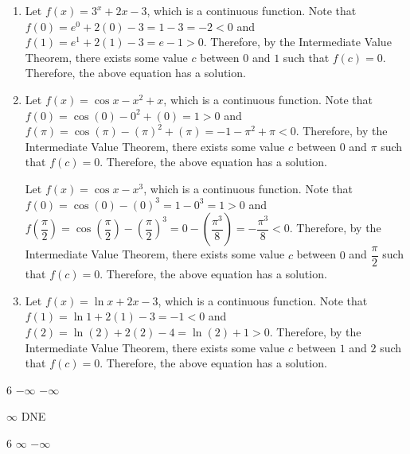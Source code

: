 \documentclass{book}
\begin{document}
\begin{appendices}
\begin{enumerate}[!HW!]
\begin{pf}
\end{pf}
\item
\begin{pf}
Let $f(x) = 3^x+2x-3$, which is a continuous function. Note that $f(0) = e^0 +2(0)-3 = 1-3 = -2 < 0$ and $f(1) = e^1+2(1) - 3 = e-1 > 0$. Therefore, by the Intermediate Value Theorem, there exists some value $c$ between $0$ and $1$ such that $f(c) = 0$. Therefore, the above equation has a solution.
\end{pf}
\item 
\begin{pf}
Let $f(x) = \cos x - x^2+x$, which is a continuous function. Note that $f(0) = \cos(0) - 0^2 +(0) = 1 > 0$ and $f(\pi) = \cos(\pi) - (\pi)^2+(\pi) =-1 -\pi^2+\pi < 0$. Therefore, by the Intermediate Value Theorem, there exists some value $c$ between $0$ and $\pi$ such that $f(c) = 0$. Therefore, the above equation has a solution.
\end{pf}
\itemspade 
\begin{pf}
Let $f(x) = \cos x - x^3$, which is a continuous function. Note that $f(0) = \cos(0) - (0)^3 = 1-0^3 = 1 > 0$ and $f\left(\dfrac{\pi}{2}\right) = \cos\left(\dfrac{\pi}{2}\right) - \left(\dfrac{\pi}{2}\right)^3 = 0 - \left(\dfrac{\pi^3}{8}\right) = -\dfrac{\pi^3}{8} < 0$. Therefore, by the Intermediate Value Theorem, there exists some value $c$ between $0$ and $\dfrac{\pi}{2}$ such that $f(c) = 0$. Therefore, the above equation has a solution.
\end{pf}
\item 
\begin{pf}
Let $f(x) = \ln x +2x -3$, which is a continuous function. Note that $f(1) = \ln 1 + 2(1) -3 = -1< 0$ and $f(2) = \ln(2) +2(2)-4 = \ln(2) +1 > 0$. Therefore, by the Intermediate Value Theorem, there exists some value $c$ between $1$ and $2$ such that $f(c) = 0$. Therefore, the above equation has a solution.
\end{pf}
\end{enumerate}
\vspace{-15 pt}
\begin{enumerate}[!HW!]
\begin{multicols}{6}
\itemspade $-\infty$
\itemspade $-\infty$

\itemspade $\infty$
\itemspade DNE
\end{multicols}
\begin{multicols}{6}
\itemspade $\infty$
\itemspade $-\infty$


\end{multicols}
\end{enumerate}
\end{appendices}
\end{document}
